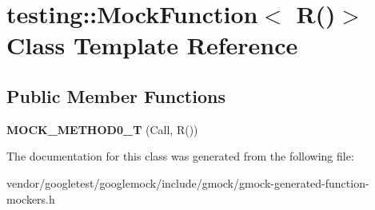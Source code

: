 \hypertarget{classtesting_1_1MockFunction_3_01R_07_08_4}{}\section{testing\+:\+:Mock\+Function$<$ R()$>$ Class Template Reference}
\label{classtesting_1_1MockFunction_3_01R_07_08_4}
\subsection*{Public Member Functions}
\begin{DoxyCompactItemize}
\item 
{\bfseries M\+O\+C\+K\+\_\+\+M\+E\+T\+H\+O\+D0\+\_\+T} (Call, R())\hypertarget{classtesting_1_1MockFunction_3_01R_07_08_4_a08e7016e3e060a5cd375b66ff0cc04e8}{}\label{classtesting_1_1MockFunction_3_01R_07_08_4_a08e7016e3e060a5cd375b66ff0cc04e8}

\end{DoxyCompactItemize}


The documentation for this class was generated from the following file\+:\begin{DoxyCompactItemize}
\item 
vendor/googletest/googlemock/include/gmock/gmock-\/generated-\/function-\/mockers.\+h\end{DoxyCompactItemize}
